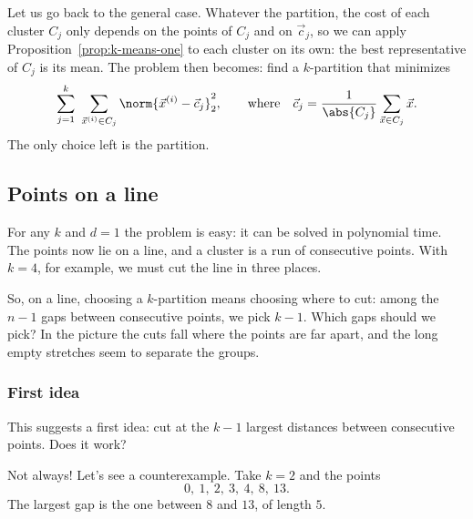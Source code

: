 \documentclass[a4paper,12pt,oneside]{report}
\begin{document}
Let us go back to the general case. Whatever the partition, the cost of
each cluster $C_j$ only depends on the points of $C_j$ and on
$\vec c_j$, so we can apply Proposition~\ref{prop:k-means-one} to each
cluster on its own: the best representative of $C_j$ is its mean. The
problem then becomes: find a $k$-partition that minimizes
\[
  \sum_{j=1}^{k}\ \sum_{\vec x^{(i)}\in C_j}
  \norm{\vec x^{(i)}-\vec c_j}_2^2,
  \qquad\text{where}\quad
  \vec c_j=\frac{1}{\abs{C_j}}\sum_{\vec x\in C_j}\vec x .
\]
The only choice left is the partition.

\subsection{Points on a line}
\label{sec:kmeans-line}

For any $k$ and $d=1$ the problem is easy: it can be solved in
polynomial time. The points now lie on a line, and a cluster is a run
of consecutive points. With $k=4$, for example, we must cut the line in
three places.

\begin{center}
\end{center}

So, on a line, choosing a $k$-partition means choosing where to cut:
among the $n-1$ gaps between consecutive points, we pick $k-1$. Which
gaps should we pick? In the picture the cuts fall where the points are
far apart, and the long empty stretches seem to separate the groups.

\subsubsection{First idea}
\label{sec:kmeans-line-gaps}

This suggests a first idea: cut at the $k-1$ largest distances between
consecutive points. Does it work?

Not always! Let's see a counterexample. Take $k=2$ and the points
\[
  0,\ 1,\ 2,\ 3,\ 4,\ 8,\ 13 .
\]
The largest gap is the one between $8$ and $13$, of length $5$.
\end{document}
